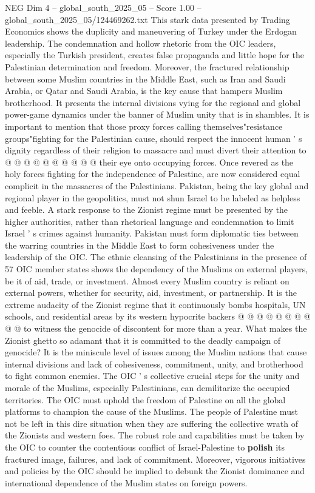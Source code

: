 \begin{textsample}{NEG Dim 4 – global\_south\_2025\_05 – Score 1.00 – global\_south\_2025\_05/124469262.txt}
This stark data presented by Trading Economics shows the duplicity and maneuvering of Turkey under the Erdogan leadership.
The condemnation and hollow rhetoric from the OIC leaders, especially the Turkish president, creates false propaganda and little hope for the Palestinian determination and freedom.
Moreover, the fractured relationship between some Muslim countries in the Middle East, such as Iran and Saudi Arabia, or Qatar and Saudi Arabia, is the key cause that hampers Muslim brotherhood.
It presents the internal divisions vying for the regional and global power-game dynamics under the banner of Muslim unity that is in shambles.
It is important to mention that those proxy forces calling themselves"resistance groups"fighting for the Palestinian cause, should respect the innocent human ' s dignity regardless of their religion to massacre and must divert their attention to @ @ @ @ @ @ @ @ @ @ their eye onto occupying forces.
Once revered as the holy forces fighting for the independence of Palestine, are now considered equal complicit in the massacres of the Palestinians.
Pakistan, being the key global and regional player in the geopolitics, must not shun Israel to be labeled as helpless and feeble.
A stark response to the Zionist regime must be presented by the higher authorities, rather than rhetorical language and condemnation to limit Israel ' s crimes against humanity.
Pakistan must form diplomatic ties between the warring countries in the Middle East to form cohesiveness under the leadership of the OIC.
The ethnic cleansing of the Palestinians in the presence of 57 OIC member states shows the dependency of the Muslims on external players, be it of aid, trade, or investment.
Almost every Muslim country is reliant on external powers, whether for security, aid, investment, or partnership.
It is the extreme audacity of the Zionist regime that it continuously bombs hospitals, UN schools, and residential areas by its western hypocrite backers @ @ @ @ @ @ @ @ @ @ to witness the genocide of discontent for more than a year.
What makes the Zionist ghetto so adamant that it is committed to the deadly campaign of genocide?
It is the miniscule level of issues among the Muslim nations that cause internal divisions and lack of cohesiveness, commitment, unity, and brotherhood to fight common enemies.
The OIC ' s collective crucial steps for the unity and morale of the Muslims, especially Palestinians, can demilitarize the occupied territories.
The OIC must uphold the freedom of Palestine on all the global platforms to champion the cause of the Muslims.
The people of Palestine must not be left in this dire situation when they are suffering the collective wrath of the Zionists and western foes.
The robust role and capabilities must be taken by the OIC to counter the contentious conflict of Israel-Palestine to \textbf{polish} its fractured image, failures, and lack of commitment.
Moreover, vigorous initiatives and policies by the OIC should be implied to debunk the Zionist dominance and international dependence of the Muslim states on foreign powers.

\end{textsample}
